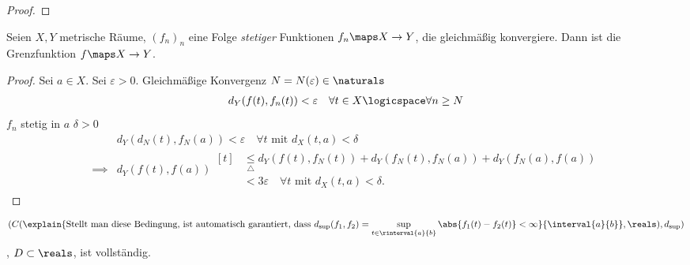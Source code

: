 \begin{lemma}
\begin{eigenschaftenenumerate}
\begin{proof}
            
        \end{proof}
        \item \label{gleichmaessige_konvergenz_stetigkeit}Seien \( X,Y\) metrische Räume, \( (f_n)_n\) eine Folge \emph{stetiger} Funktionen \( f_n\maps X\to Y\), die gleichmäßig konvergiere. Dann ist die Grenzfunktion \( f\maps X\to Y\).
        \begin{proof}
            Sei \( a\in X\). Sei \( \varepsilon>0 \). Gleichmäßige Konvergenz \timplies \texists \( N=N(\varepsilon)\in \naturals \) \sd 
            \begin{align*}
                d_Y(f(t),f_n(t))<\varepsilon\quad \forall t\in X\logicspace \forall n\geq N
            \end{align*} 
            \( f_n\) stetig in \( a\) \timplies \texists \( \delta > 0 \) \sd
            \begin{align*}
                &d_Y(d_N(t),f_N(a))<\varepsilon\quad \forall t\text{ mit } d_X(t,a)<\delta\\
                \implies &d_Y(f(t),f(a))\begin{aligned}[t]
                    &\underset{\triangle}{\leq}d_Y(f(t),f_N(t))+d_Y(f_N(t),f_N(a))+d_Y(f_N(a),f(a))\\
                    &<3\varepsilon\quad \forall t\text{ mit }d_X(t,a)<\delta.
                \end{aligned}
            \end{align*}
            
        \end{proof}
         
    \end{eigenschaftenenumerate}
        
\end{lemma}
\begin{folgerung}
    \begin{align*}
        (C(\explain{\text{Stellt man diese Bedingung, ist automatisch garantiert, dass \( d_{\sup}(f_1,f_2)=\sup_{t\in \rinterval{a}{b}}\abs{f_1(t)-f_2(t)}<\infty \)}}{\interval{a}{b}},\reals),d_{\sup})
    \end{align*}, \( D\subset \reals \), ist vollständig.  
\end{folgerung}

